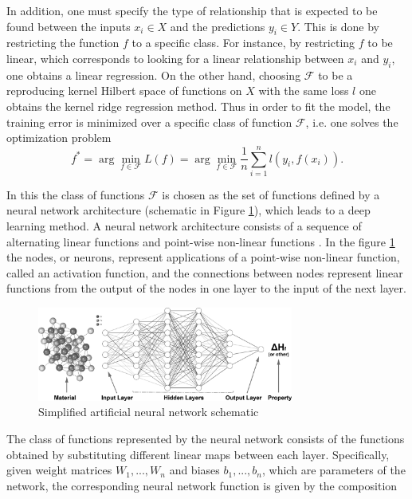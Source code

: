 In addition, one must specify the type of relationship that is expected to be found between the inputs $x_i\in X$ and the predictions $y_i\in Y$. This is done by restricting the function $f$ to a specific class. For instance, by restricting $f$ to be linear, which corresponds to looking for a linear relationship between $x_i$ and $y_i$, one obtains a linear regression. On the other hand, choosing $\mathcal{F}$ to be a reproducing kernel Hilbert space of functions on $X$ with the same loss $l$ one obtains the kernel ridge regression method. Thus in order to fit the model, the training error is minimized over a specific class of function $\mathcal{F}$, i.e. one solves the optimization problem
\begin{equation}\label{sipfenn:empirical_risk_min_eq}
    f^* = \arg\min_{f\in \mathcal{F}} L(f) = \arg\min_{f\in \mathcal{F}} \frac{1}{n}\displaystyle\sum_{i=1}^n l(y_i, f(x_i)).
\end{equation}

In this the class of functions $\mathcal{F}$ is chosen as the set of functions defined by a neural network architecture (schematic in Figure \ref{sipfenn:fig:nnschematic}), which leads to a deep learning method. A neural network architecture consists of a sequence of alternating linear functions and point-wise non-linear functions \cite{goodfellow2016deep}. In the figure \ref{sipfenn:fig:nnschematic} the nodes, or neurons, represent applications of a point-wise non-linear function, called an activation function, and the connections between nodes represent linear functions from the output of the nodes in one layer to the input of the next layer.

\begin{figure}
    \centering
    \includegraphics[width=0.75\textwidth]{sipfenn/NN_schematic.png}
    \caption{Simplified artificial neural network schematic}
    \label{sipfenn:fig:nnschematic}
\end{figure}

The class of functions represented by the neural network consists of the functions obtained by substituting different linear maps between each layer. Specifically, given weight matrices $W_1,...,W_n$ and biases $b_1,...,b_n$, which are parameters of the network, the corresponding neural network function is given by the composition

